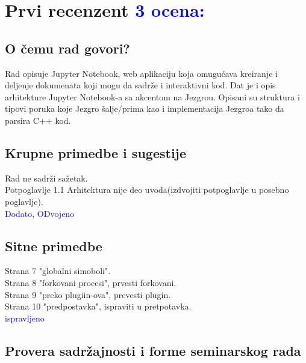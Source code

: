 \documentclass[a4paper]{report}
\newcommand{\odgovor}[1]{\textcolor{blue}{#1}}
\begin{document}
\chapter{Prvi recenzent \odgovor{3 ocena:} }


\section{O čemu rad govori?}
Rad opisuje  Jupyter Notebook, web aplikaciju koja omugućava  kreiranje i deljenje dokumenata koji  mogu da sadrže i interaktivni kod. Dat je i opis arhitekture Jupyter Notebook-a sa akcentom na Jezgrou. Opisani su struktura i tipovi poruka koje Jezgro šalje/prima kao i implementacija Jezgroa tako da parsira C++ kod.
\section{Krupne primedbe i sugestije}
Rad ne sadrži sažetak. \\
Potpoglavlje 1.1 Arhitektura nije deo uvoda(izdvojiti potpoglavlje u posebno poglavlje).\\
\odgovor{Dodato, ODvojeno}
\section{Sitne primedbe}
Strana 7 "globalni simoboli".\\
Strana 8 "forkovani procesi", prvesti forkovani.\\
Strana 9 "preko plugiin-ova", prevesti plugin.\\
Strana 10 "predpostavka", ispraviti u pretpotavka.\\


\odgovor{ispravljeno}

\section{Provera sadržajnosti i forme seminarskog rada}
\end{document}
